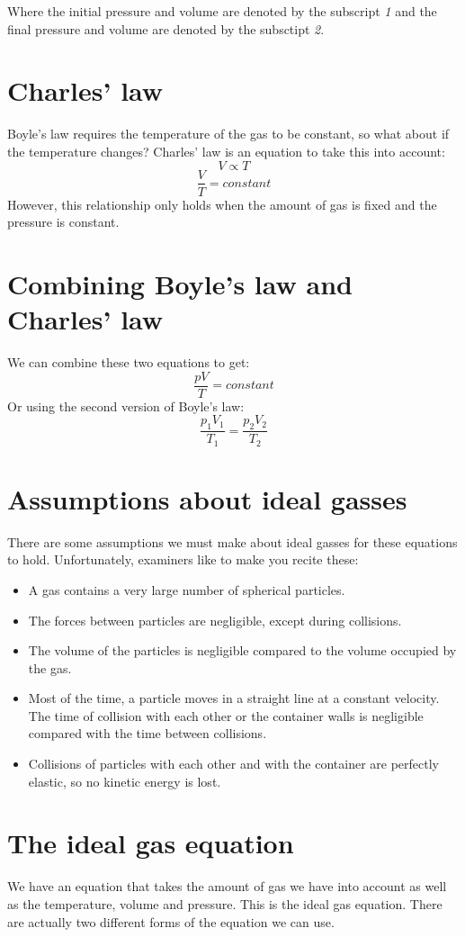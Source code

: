 \documentclass{article}
\begin{document}
Where the initial pressure and volume are denoted by the subscript \textit{1}
and the final pressure and volume are denoted by the subsctipt \textit{2}.

\section*{Charles' law}
Boyle's law requires the temperature of the gas to be constant, so what about if
the temperature changes? Charles' law is an equation to take this into account:
\[
	V \propto T
\]
\[
	\frac{V}{T} = constant
\]
However, this relationship only holds when the amount of gas is fixed and the
pressure is constant.

\section*{Combining Boyle's law and Charles' law}
We can combine these two equations to get:
\[
	\frac{pV}{T} = constant
\]
Or using the second version of Boyle's law:
\[
	\frac{p_1V_1}{T_1} = \frac{p_2V_2}{T_2}
\]

\section*{Assumptions about ideal gasses}
There are some assumptions we must make about ideal gasses for these equations
to hold. Unfortunately, examiners like to make you recite these:

\begin{itemize}
	\item A gas contains a very large number of spherical particles.
	\item The forces between particles are negligible, except during collisions.
	\item The volume of the particles is negligible compared to the volume
	occupied by the gas.
	\item Most of the time, a particle moves in a straight line at a constant
	velocity. The time of collision with each other or the container walls is
	negligible compared with the time between collisions.
	\item Collisions of particles with each other and with the container are
	perfectly elastic, so no kinetic energy is lost.
\end{itemize}

\section*{The ideal gas equation}
We have an equation that takes the amount of gas we have into account as well
as the temperature, volume and pressure. This is the ideal gas equation. There
are actually two different forms of the equation we can use.
\end{document}
